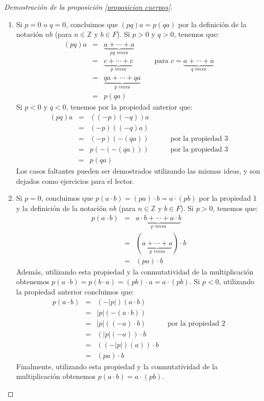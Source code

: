 \begin{proof}[Demostración de la proposición \ref{proposicion cuerpos}]
\begin{enumerate}
\item Si $p = 0$ o $q = 0$, concluimos que $(pq)a = p(qa)$ por
        la definición de la notación $nb$ (para $n \in \mathbb{Z}$ y $b \in
        F$). Si $p > 0$ y $q > 0$, tenemos que:
\begin{eqnarray*}
(pq)a &=& \underbrace{a +\cdots + a}_\text{$pq$ veces}\\
 &=& \underbrace{c +\cdots + c}_\text{$p$ veces} \quad\quad\quad \text{para }
 c = \underbrace{a +\cdots + a}_\text{$q$ veces}\\
 & = & \underbrace{qa +\cdots + qa}_\text{$p$ veces}\\
 & = & p(qa)
\end{eqnarray*}
Si $p < 0$ y $q < 0$, tenemos por la propiedad anterior que:
\begin{eqnarray*}
(pq)a &=& ((-p)(-q))a\\
 &=& (-p)((-q)a)\\
 &=& (-p)(-(qa)) \quad\quad\quad \text{por la propiedad 3}\\
 &=& p(-(-(qa))) \quad\quad\quad \text{por la propiedad 3}\\
 &=& p(qa)
\end{eqnarray*}
Los casos faltantes pueden ser demostrados utilizando las mismas ideas, y son dejados como ejercicios para el lector.

	\item Si $p = 0$, concluimos que $p(a\cdot b) = (pa)\cdot b = a \cdot (pb)$ por la propiedad 1 y la definición de la notación $nb$ (para $n \in \mathbb{Z}$ y $b \in F$). Si $p > 0$, tenemos que:
	\begin{eqnarray*}
		p(a\cdot b)&=&\underbrace{a\cdot b +\cdots + a\cdot b}_\text{$p$ veces}\\
		&=&(\underbrace{a +\cdots + a}_\text{$p$ veces}) \cdot b\\
		&=&(pa) \cdot b
	\end{eqnarray*}		
Además, utilizando esta propiedad y la conmutatividad de la multiplicación obtenemos $p(a\cdot b) = p(b \cdot a) = (pb) \cdot a = a \cdot (pb)$. Si $p < 0$, utilizando la propiedad anterior concluimos que:
	\begin{eqnarray*}
		p(a\cdot b)&=& (-|p|)(a \cdot b)\\
		&=& |p|(-(a \cdot b))\\
		&=& |p|((-a) \cdot b) \quad\quad\quad \text{por la propiedad 2}\\
		&=& (|p|(-a)) \cdot b\\
		&=& ((-|p|)(a)) \cdot b\\
		&=& (pa) \cdot b
	\end{eqnarray*}
	Finalmente, utilizando esta propiedad y la conmutatividad de la multiplicación obtenemos $p(a\cdot b) = a \cdot (pb)$. 


\end{enumerate}
\end{proof}
